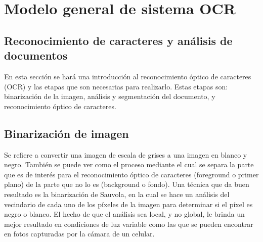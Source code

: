 \documentclass[a4paper, 11pt, oneside]{report}
\begin{document}
\section{Modelo general de sistema OCR}
\subsection{Reconocimiento de caracteres y análisis de documentos}
En esta sección se hará una introducción al reconocimiento óptico de caracteres (OCR) y las etapas que son necesarias para realizarlo. Estas etapas son: binarización de la imagen, análisis y segmentación del documento, y reconocimiento óptico de caracteres. 
\subsection{Binarización de imagen}
Se refiere a convertir una imagen de escala de grises a una imagen en blanco y negro. También se puede ver como el proceso mediante el cual se separa la parte que es de interés para el reconocimiento óptico de caracteres (foreground o primer plano) de la parte que no lo es (background o fondo). Una técnica que da buen resultado es la binarización de Sauvola, en la cual se hace un análisis del vecindario de cada uno de los píxeles de la imagen para determinar si el píxel es negro o blanco. El hecho de que el análisis sea local, y no global, le brinda un mejor resultado en condiciones de luz variable como las que se pueden encontrar en fotos capturadas por la cámara de un celular.
\end{document}
